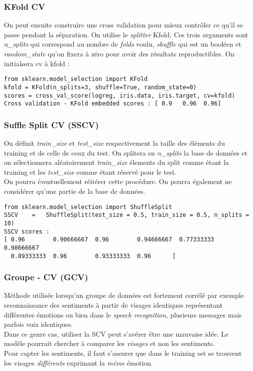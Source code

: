 \documentclass[a4paper,12pt]{report}
\newcommand{\rbk}[1]{\color{red}\textit{#1} \color{black}  
}
\newcommand\bk{\color{black}}
\numberwithin{equation}{section} %
\begin{document}
\subsubsection{KFold CV}
On peut ensuite construire une cross validation pour mieux contrôler ce qu'il se passe pendant la séparation.
On utilise le \textit{splitter} Kfold. Ces trois arguments sont \color{red}\textit{n\_splits} \bk qui correspond au nombre de \textit{folds} voulu, \color{red} \textit{shuffle} \bk qui est un booléen et \color{red}\textit{random\_state} \bk qu'on fixera à zéro pour avoir des résultats reproductibles. On initialsera \color{red} cv \bk à kfold :
\begin{lstlisting}
from sklearn.model_selection import KFold
kfold = KFold(n_splits=3, shuffle=True, random_state=0)
scores = cross_val_score(logreg, iris.data, iris.target, cv=kfold)
Cross validation - KFold embedded scores : [ 0.9   0.96  0.96]
\end{lstlisting}

\subsubsection{Suffle Split CV (SSCV)}
On définit \rbk{train\_size} et \rbk{test\_size} respectivement la taille des éléments du training et de celle de ceux du test. On splitera en \rbk{n\_splits} la base de données et on sélectionnera aléatoirement \rbk{train\_size} élements du split comme étant la training  et les \rbk{test\_size} comme étant réservé pour le test.\\
On pourra éventuellement réitérer cette procédure. On pourra également ne considérer qu'une partie de la base de données.
\begin{lstlisting}
from sklearn.model_selection import ShuffleSplit
SSCV	=   ShuffleSplit(test_size = 0.5, train_size = 0.5, n_splits = 10)
SSCV scores : 
[ 0.96        0.90666667  0.96        0.94666667  0.77333333  0.98666667
  0.89333333  0.96        0.93333333  0.96      ]

\end{lstlisting}

\subsubsection{Groupe - CV (GCV)}
Méthode utilisée lorsqu'un groupe de données est fortement corrélé par exemple reconnaissance des sentiments à partir de visages identiques représentant différentes émotions ou bien dans le \textit{speech recognition}, plusieurs messages mais parfois voix identiques.\\
Dans ce genre cas, utiliser la SCV peut s'avérer être une mauvaise idée. Le modèle pourrait chercher à comparer les \textit{visages} et non les sentiments.\\
Pour capter les sentiments, il faut s'assurer que dans le training set se trouvent les visages \textit{différents} exprimant la \textit{même} émotion.\\
\end{document}
